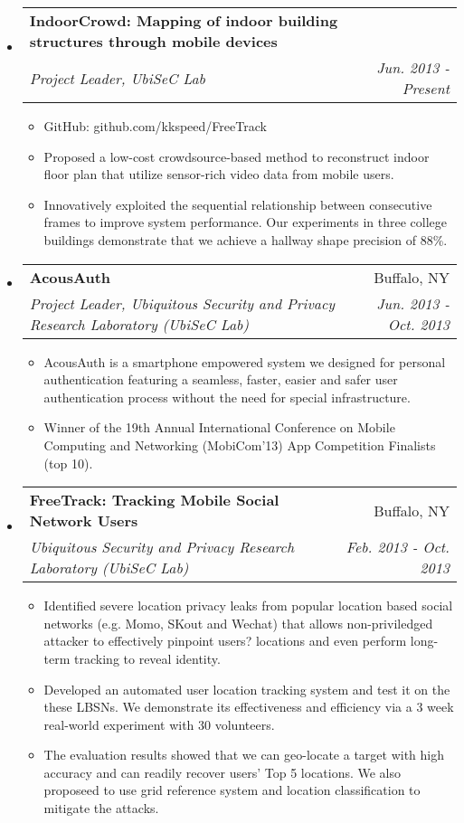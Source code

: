 \documentclass[a4paper, 11pt]{article}
\makeatletter
\newcommand{\resitem}[1]{\item #1 \vspace{-2pt}}
\newcommand{\ressubheading}[4]{
\begin{tabular*}{6.5in}{l@{\extracolsep{\fill}}r}
		\textbf{#1} & #2 \\
		\textit{#3} & \textit{#4} \\
\end{tabular*}\vspace{-6pt}}
\newcommand{\ressection}[1]
{\fcolorbox{black}{shadecolor}{\vbox{\hsize 0.98\textwidth \textbf{\mbox{~}{\@ \large #1} \vphantom{p\^{E}}}}}}
\makeatother
\begin{document}
\ressection{Projects}

\begin{itemize}
\item
	\ressubheading{IndoorCrowd: Mapping of indoor building structures through mobile devices}{}{Project Leader, 
UbiSeC Lab}{Jun. 2013 - Present}
	\begin{itemize}
	\resitem{GitHub: github.com/kkspeed/FreeTrack}
		\resitem{Proposed a low-cost crowdsource-based method to reconstruct indoor floor plan that utilize sensor-rich video data from mobile users. }
\resitem{Innovatively exploited the sequential relationship between consecutive
frames to improve system performance. Our experiments in three college buildings demonstrate
that we achieve a hallway shape precision of 88\%. }
	\end{itemize}


\item
	\ressubheading{AcousAuth}{Buffalo, NY}{Project Leader, Ubiquitous Security and Privacy Research Laboratory
(UbiSeC Lab)}{Jun. 2013 - Oct. 2013}
	\begin{itemize}
		\resitem{AcousAuth is a smartphone empowered system we designed for personal authentication featuring
a seamless, faster, easier and safer user authentication process without the need for special
infrastructure. }
                 \resitem{Winner of the 19th Annual International Conference on Mobile Computing and Networking (MobiCom'13) App Competition Finalists (top 10).}
	\end{itemize}

\item
	\ressubheading{FreeTrack: Tracking Mobile Social Network Users}{Buffalo, NY}{Ubiquitous Security and Privacy Research Laboratory
(UbiSeC Lab)}{Feb. 2013 - Oct. 2013}
	\begin{itemize}
		\resitem{Identified severe location privacy leaks from popular location based social networks (e.g. Momo,
SKout and Wechat) that allows non-priviledged attacker to effectively pinpoint users? locations and even
perform long-term tracking to reveal identity. }
                 \resitem{Developed an automated user location tracking system
and test it on the these LBSNs. We demonstrate its effectiveness and efficiency via a 3 week real-world
experiment with 30 volunteers.}
  \resitem{The evaluation results showed that we can geo-locate a target with high
accuracy and can readily recover users' Top 5 locations. We also proposeed to use grid reference system
and location classification to mitigate the attacks.}
	\end{itemize}
	

\end{itemize}
\end{document}
